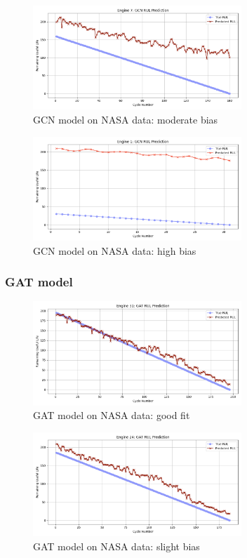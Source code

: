 \documentclass[12pt]{article}
\begin{document}
\begin{figure}[h!]
    \centering
    \includegraphics[width=0.7\textwidth]{figures/NASA/NASA_GCN_eng2.png} 
    \caption{GCN model on NASA data: moderate bias}
    \label{fig_NASA_GCN_eng2}
\end{figure}

\begin{figure}[h!]
    \centering
    \includegraphics[width=0.7\textwidth]{figures/NASA/NASA_GCN_eng1.png} 
    \caption{GCN model on NASA data: high bias}
    \label{fig_NASA_GCN_eng1}
\end{figure}

\subsubsection{GAT model}
\begin{figure}[h!]
    \centering
    \includegraphics[width=0.7\textwidth]{figures/NASA/NASA_GAT_eng7.png} 
    \caption{GAT model on NASA data: good fit}
    \label{fig_NASA_GAT_eng7}
\end{figure}

\begin{figure}[h!]
    \centering
    \includegraphics[width=0.7\textwidth]{figures/NASA/NASA_GAT_eng6.png} 
    \caption{GAT model on NASA data: slight bias}
    \label{fig_NASA_GAT_eng6}
\end{figure}
\end{document}
